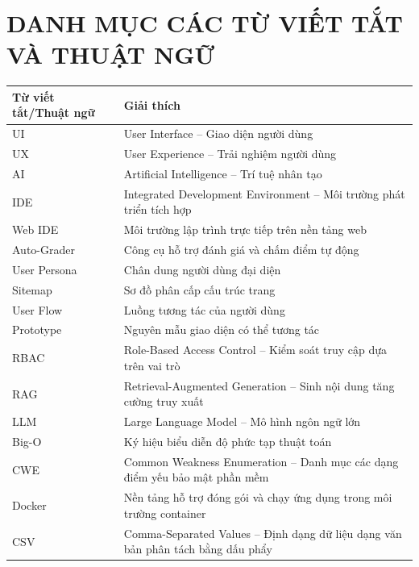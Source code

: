 \documentclass[12pt,a4paper,oneside]{report}
\begin{document}
\newpage

\tableofcontents
\newpage

\chapter*{DANH MỤC CÁC TỪ VIẾT TẮT VÀ THUẬT NGỮ}

\begin{longtable}{|p{3.5cm}|p{11.5cm}|}
\hline
\textbf{Từ viết tắt/Thuật ngữ} & \textbf{Giải thích} \\
\hline
\endhead
\hline
\endfoot
UI & User Interface -- Giao diện người dùng \\
\hline
UX & User Experience -- Trải nghiệm người dùng \\
\hline
AI & Artificial Intelligence -- Trí tuệ nhân tạo \\
\hline
IDE & Integrated Development Environment -- Môi trường phát triển tích hợp \\
\hline
Web IDE & Môi trường lập trình trực tiếp trên nền tảng web \\
\hline
Auto-Grader & Công cụ hỗ trợ đánh giá và chấm điểm tự động \\
\hline
User Persona & Chân dung người dùng đại diện \\
\hline
Sitemap & Sơ đồ phân cấp cấu trúc trang \\
\hline
User Flow & Luồng tương tác của người dùng \\
\hline
Prototype & Nguyên mẫu giao diện có thể tương tác \\
\hline
RBAC & Role-Based Access Control -- Kiểm soát truy cập dựa trên vai trò \\
\hline
RAG & Retrieval-Augmented Generation -- Sinh nội dung tăng cường truy xuất \\
\hline
LLM & Large Language Model -- Mô hình ngôn ngữ lớn \\
\hline
Big-O & Ký hiệu biểu diễn độ phức tạp thuật toán \\
\hline
CWE & Common Weakness Enumeration -- Danh mục các dạng điểm yếu bảo mật phần mềm \\
\hline
Docker & Nền tảng hỗ trợ đóng gói và chạy ứng dụng trong môi trường container \\
\hline
CSV & Comma-Separated Values -- Định dạng dữ liệu dạng văn bản phân tách bằng dấu phẩy \\
\hline
\end{longtable}
\end{document}

